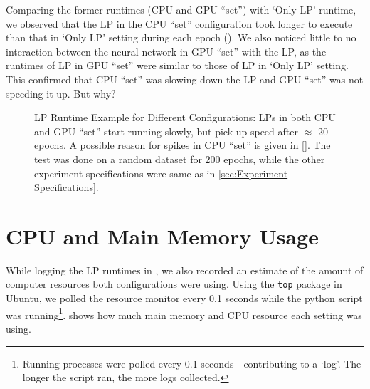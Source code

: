 Comparing the former runtimes (CPU and GPU ``set'') with `Only LP' runtime, we observed that the LP in the CPU ``set'' configuration took longer to execute than that in `Only LP' setting during each epoch (). We also noticed little to no interaction between the neural network in GPU ``set'' with the LP, as the runtimes of LP in GPU ``set'' were similar to those of LP in `Only LP' setting. This confirmed that CPU ``set'' was slowing down the LP and GPU ``set'' was not speeding it up. But why?
\begin{figure}[!htbp]
    \centering
    \caption[LP Runtime Example for Different Configurations]{LP Runtime Example for Different Configurations: LPs in both CPU and GPU ``set'' start running slowly, but pick up speed after $\approx$ 20 epochs. A possible reason for spikes in CPU ``set'' is given in []. The test was done on a random dataset for 200 epochs, while the other experiment specifications were same as in \cref{sec:Experiment Specifications}.}
    \label{fig:LP Runtime Example for Different Configurations}
\end{figure}

\section{CPU and Main Memory Usage} \label{app:CPU and Main Memory Usage}
While logging the LP runtimes in , we also recorded an estimate of the amount of computer resources both configurations were using. Using the \texttt{top} package in Ubuntu, we polled the resource monitor every 0.1 seconds while the python script was running\footnote{\label{foo:logs not epochs} Running processes were polled every 0.1 seconds - contributing to a `log'. The longer the script ran, the more logs collected.}.  shows how much main memory and CPU resource each setting was using.

